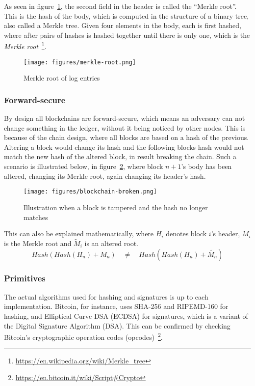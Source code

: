 As seen in figure~\ref{fig:merkle-root}, the second field in the
header is called the ``Merkle root''. This is the hash of the body,
which is computed in the structure of a binary tree, also called a
Merkle tree. Given four elements in the body, each is first hashed,
where after pairs of hashes is hashed together until there is only
one, which is the \textit{Merkle
  root}~\footnote{\url{https://en.wikipedia.org/wiki/Merkle_tree}}.
\begin{figure}[H]
  \centering
  \texttt{[image: figures/merkle-root.png]}
  \caption{\label{fig:merkle-root} Merkle root of log entries}
\end{figure}

\subsubsection{Forward-secure}
\label{sec:block-forward-secure}
By design all blockchains are forward-secure, which means an adversary
can not change something in the ledger, without it being noticed by
other nodes. This is because of the chain design, where all blocks are
based on a hash of the previous. Altering a block would change its
hash and the following blocks hash would not match the new hash of the
altered block, in result breaking the chain. Such a scenario is
illustrated below, in figure~\ref{fig:blockchain-broken}, where block
$n+1$'s body has been altered, changing its Merkle root, again
changing its header's hash.
\begin{figure}[ht]
  \centering
  \texttt{[image: figures/blockchain-broken.png]}
  \caption{\label{fig:blockchain-broken} Illustration when a block is
    tampered and the hash no longer matches}
\end{figure}

This can also be explained mathematically, where $H_i$ denotes block
$i$'s header, $M_i$ is the Merkle root and $\widetilde{M}_i$
is an altered root.
\begin{equation}
Hash(Hash(H_n) + M_n) \quad\neq\quad Hash(Hash(H_n) + \widetilde{M_n})
\end{equation}

\subsubsection{Primitives}
\label{sec:block-crypto-prims}
The actual algorithms used for hashing and signatures is up to each
implementation. Bitcoin, for instance, uses SHA-256 and RIPEMD-160 for
hashing, and Elliptical Curve DSA (ECDSA) for signatures, which is a
variant of the Digital Signature Algorithm (DSA). This can be
confirmed by checking Bitcoin's cryptographic operation codes
(opcodes)~\footnote{\url{https://en.bitcoin.it/wiki/Script\#Crypto}}.

